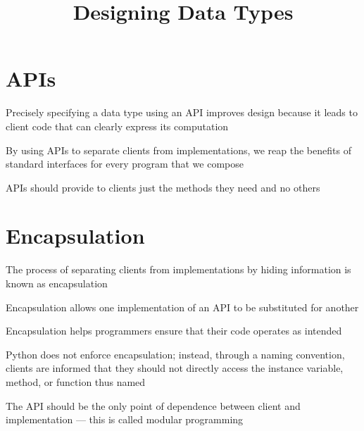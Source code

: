 \documentclass[8pt,a4paper,compress]{beamer}
\title{Designing Data Types}
\date{}
\begin{document}
\begin{frame}
\vfill
\titlepage
\end{frame}

\section{APIs}
\begin{frame}[fragile]
\pause

Precisely specifying a data type using an API improves design because it leads to client code that can clearly express its computation 

\pause
\bigskip

By using APIs to separate clients from implementations, we reap the benefits of standard interfaces for every program that we compose

\pause
\bigskip

APIs should provide to clients just the methods they need and no others
\end{frame}

\section{Encapsulation}
\begin{frame}[fragile]
\pause

The process of separating clients from implementations by hiding information is known as encapsulation

\pause
\bigskip

Encapsulation allows one implementation of an API to be substituted for another

\pause
\bigskip

Encapsulation helps programmers ensure that their code operates as intended

\pause
\bigskip

Python does not enforce encapsulation; instead, through a naming convention, clients are informed that they should not directly access the instance variable, method, or function thus named

\pause
\bigskip

The API should be the only point of dependence between client and implementation --- this is called modular programming
\end{frame}
\end{document}
